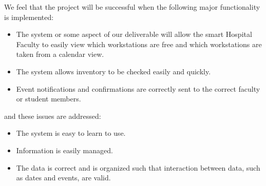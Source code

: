 \begin{flushleft}
We feel that the project will be successful when the following major functionality is implemented: 
\end{flushleft}
\begin{itemize}
	\item The system or some aspect of our deliverable will allow the smart Hospital Faculty to easily view which workstations are free and which workstations are taken from a calendar view.
	\item The system allows inventory to be checked easily and quickly.
	\item Event notifications and confirmations are correctly sent to the correct faculty or student members.
\end{itemize}
\begin{flushleft}
and these issues are addressed:
\end{flushleft}
\begin{itemize}
	\item The system is easy to learn to use.
	\item Information is easily managed. 
	\item The data is correct and is organized such that interaction between data, such as dates and events, are valid.
\end{itemize} 
	 